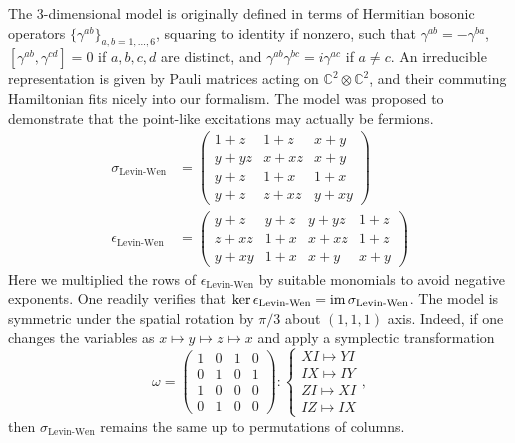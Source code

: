 \begin{example}
\label{eg:Levin-Wen-fermion-model}
The 3-dimensional model is originally defined 
in terms of Hermitian bosonic operators $\{ \gamma^{ab} \}_{a,b=1,\ldots,6}$,
squaring to identity if nonzero,
such that $\gamma^{ab}=-\gamma^{ba}$,
$[\gamma^{ab},\gamma^{cd}]=0$ if $a,b,c,d$ are distinct,
and
$\gamma^{ab}\gamma^{bc}=i\gamma^{ac}$ if $a \neq c$.
An irreducible representation is given by Pauli matrices acting on $\mathbb{C}^2 \otimes \mathbb{C}^2$,
and their commuting Hamiltonian fits nicely into our formalism.
The model was proposed to demonstrate that the point-like excitations may actually be fermions.
\begin{align*}
 \sigma_\text{Levin-Wen} &=
\begin{pmatrix}
 1+z & 1+z & x+y \\
 y+y z & x+x z & x+y \\
 y+z & 1+x & 1+x \\
 y+z & z+x z & y+x y
\end{pmatrix} \\
 \epsilon_\text{Levin-Wen} &=
\begin{pmatrix}
 y+z & y+z & y+y z & 1+z \\
 z+x z & 1+x & x+x z & 1+z \\
 y+x y & 1+x & x+y & x+y
\end{pmatrix}
\end{align*}
Here we multiplied the rows of $\epsilon_\text{Levin-Wen}$ by suitable monomials to avoid negative exponents.
One readily verifies that $\ker \epsilon_\text{Levin-Wen} = \mathop{\mathrm{im}}\nolimits \sigma_\text{Levin-Wen}$.
The model is symmetric under the spatial rotation by $\pi/3$ about $(1,1,1)$ axis.
Indeed, if one changes the variables as $x \mapsto y \mapsto z \mapsto x$ and apply a symplectic transformation
\begin{equation}
 \omega = 
 \begin{pmatrix}
 1 & 0 & 1 & 0 \\
 0 & 1 & 0 & 1 \\
 1 & 0 & 0 & 0 \\
 0 & 1 & 0 & 0
 \end{pmatrix} :
 \begin{cases}
   XI \mapsto YI \\
   IX \mapsto IY \\
   ZI \mapsto XI \\
   IZ \mapsto IX
\end{cases} ,
\label{eq:symplectic-Levin-Wen}
\end{equation}
then $\sigma_\text{Levin-Wen}$ remains the same up to permutations of columns.



\end{example}
